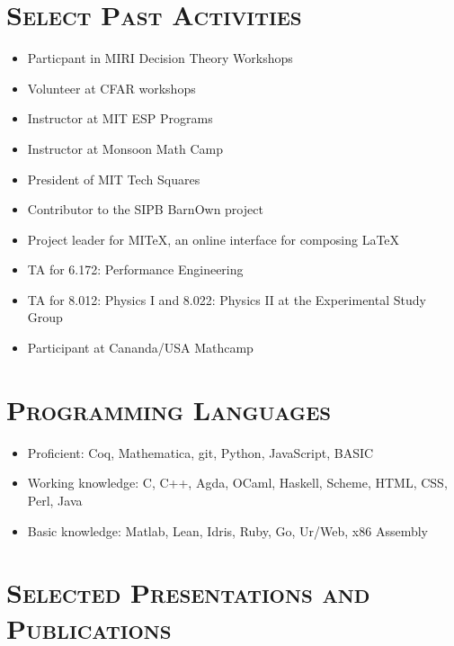 \documentclass[11pt]{res}
\begin{document}
\section{\textsc{Select Past Activities}}

\begin{itemize}
\item Particpant in MIRI Decision Theory Workshops
\item Volunteer at CFAR workshops
\item Instructor at MIT ESP Programs
\item Instructor at Monsoon Math Camp
\item President of MIT Tech Squares
\item Contributor to the SIPB BarnOwn project
\item Project leader for MITeX, an online interface for composing \LaTeX
\item TA for 6.172: Performance Engineering
\item TA for 8.012: Physics I and 8.022: Physics II at the Experimental Study Group
\item Participant at Cananda/USA Mathcamp
\end{itemize}

\section{\textsc{Programming Languages}}
\begin{itemize}
\item
  Proficient: Coq, %
  Mathematica, git, Python, JavaScript, BASIC
\item
  Working knowledge: %
  C, C++, Agda, OCaml, Haskell, Scheme, HTML, CSS, Perl, Java
\item
  Basic knowledge: Matlab, Lean, Idris, Ruby, Go, Ur/Web, x86 Assembly
\end{itemize}

\nocite{*}

\clearpage
\section{\textsc{Selected Presentations and Publications}}
\printbibliography[title={$\left.\right.$},notcategory=exclude]

\endresume
\end{document}
